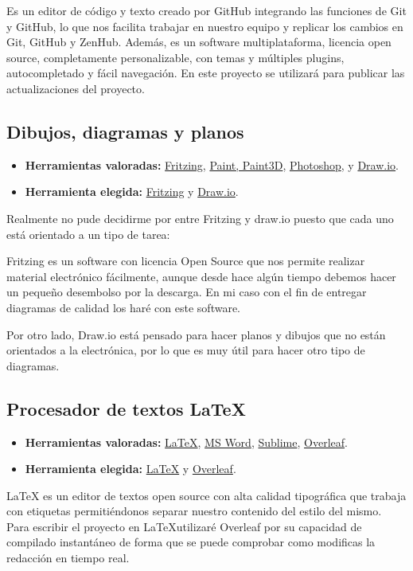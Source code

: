 Es un editor de código y texto creado por GitHub integrando las funciones de Git y GitHub, lo que nos facilita trabajar en nuestro equipo y replicar los cambios en Git, GitHub y ZenHub. Además, es un software multiplataforma, licencia open source, completamente personalizable, con temas y múltiples plugins, autocompletado y fácil navegación.
En este proyecto se utilizará para publicar las actualizaciones del proyecto.



\subsection{Dibujos, diagramas y planos}
\begin{itemize}
    \item \textbf{Herramientas valoradas:} \href{https://fritzing.org/}{Fritzing}, \href{https://support.microsoft.com/es-es/windows/obtener-microsoft-paint-a6b9578c-ed1c-5b09-0699-4ed8115f9aa9}{Paint, Paint3D}, \href{https://www.adobe.com/es/products/photoshop.html}{Photoshop}, y \href{www.draw.io}{Draw.io}.
    \item \textbf{Herramienta elegida:} \href{https://fritzing.org/}{Fritzing} y \href{www.draw.io}{Draw.io}.
\end{itemize}
Realmente no pude decidirme por entre Fritzing y draw.io puesto que cada uno está orientado a un tipo de tarea:

Fritzing es un software con licencia Open Source\cite{misc:OpenSource} que nos permite realizar material electrónico fácilmente, aunque desde hace algún tiempo debemos hacer un pequeño desembolso por la descarga. En mi caso con el fin de entregar diagramas de calidad los haré con este software.

Por otro lado, Draw.io está pensado para hacer planos y dibujos que no están orientados a la electrónica, por lo que es muy útil para hacer otro tipo de diagramas.

\subsection{Procesador de textos \LaTeX}
\begin{itemize}
    \item \textbf{Herramientas valoradas:} \href{https://www.latex-project.org/}{\LaTeX}, \href{https://www.microsoft.com/es-es/microsoft-365/word}{MS Word}, \href{https://www.sublimetext.com/}{Sublime}, \href{https://www.overleaf.com/}{Overleaf}.
    \item \textbf{Herramienta elegida:} \href{https://www.latex-project.org/}{\LaTeX} y \href{https://www.overleaf.com/}{Overleaf}.
\end{itemize}
\LaTeX{} es un editor de textos open source\cite{misc:OpenSource} con alta calidad tipográfica que trabaja con etiquetas permitiéndonos separar nuestro contenido del estilo del mismo. Para escribir el proyecto en \LaTeX utilizaré Overleaf por su capacidad de compilado instantáneo de forma que se puede comprobar como modificas la redacción en tiempo real.

